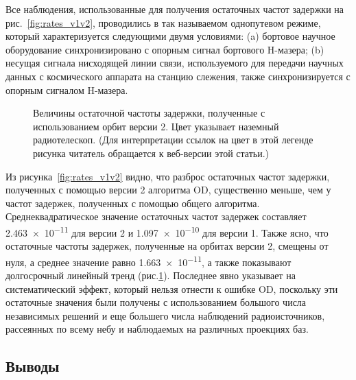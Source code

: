 Все наблюдения, использованные для получения остаточных частот задержки на
рис.~\ref{fig:rates_v1v2}, проводились в так называемом однопутевом режиме, который
характеризуется следующими двумя условиями: (a) бортовое научное оборудование синхронизировано с
опорным сигнал бортового H-мазера; (b) несущая сигнала нисходящей линии связи, используемого для
передачи научных данных с космического аппарата на станцию слежения, также синхронизируется с
опорным сигналом H-мазера.

\begin{figure}
 \caption{Величины остаточной частоты задержки, полученные с использованием орбит версии 2. Цвет
указывает наземный радиотелескоп. (Для интерпретации ссылок на цвет в этой легенде
рисунка читатель обращается к веб-версии этой статьи.)}
 \label{fig:rrates}
\end{figure}

Из рисунка~\ref{fig:rates_v1v2} видно, что разброс остаточных частот задержки, полученных с
помощью версии 2 алгоритма OD, существенно меньше, чем у частот задержек, полученных с помощью
общего алгоритма. Среднеквадратическое значение остаточных частот задержек составляет
\num{2.463e-11} для версии 2 и \num{1.097e-10} для версии 1. Также ясно, что остаточные частоты
задержек, полученные на орбитах версии 2, смещены от нуля, а среднее значение равно
\num{1.663e-11}, а также показывают долгосрочный линейный тренд (рис.\ref{fig:rrates}). Последнее
явно указывает на систематический эффект, который нельзя отнести к ошибке OD, поскольку эти
остаточные значения были получены с использованием большого числа независимых решений и
еще большего числа наблюдений радиоисточников, рассеянных по всему небу и наблюдаемых на различных
проекциях баз.

\subsection{Выводы}

